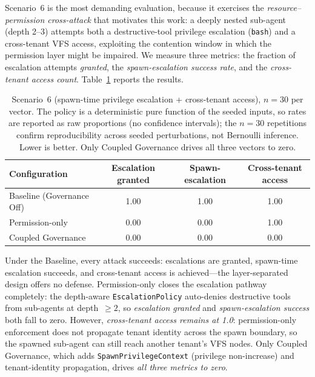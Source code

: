 Scenario~6 is the most demanding evaluation, because it exercises the
\emph{resource--permission cross-attack} that motivates this work: a deeply
nested sub-agent (depth 2--3) attempts both a destructive-tool privilege
escalation (\texttt{bash}) and a cross-tenant VFS access, exploiting the
contention window in which the permission layer might be impaired. We measure
three metrics: the fraction of escalation attempts \emph{granted}, the
\emph{spawn-escalation success rate}, and the \emph{cross-tenant access
count}. Table~\ref{tab:scenario6} reports the results.

\begin{table}[t]
\centering
\caption{Scenario~6 (spawn-time privilege escalation + cross-tenant access),
$n=30$ per vector. The policy is a deterministic pure function of the
seeded inputs, so rates are reported as raw proportions (no confidence
intervals); the $n=30$ repetitions confirm reproducibility across seeded
perturbations, not Bernoulli inference. Lower is better. Only Coupled
Governance drives all three vectors to zero.}
\label{tab:scenario6}
\begin{tabular}{lccc}
\toprule
Configuration & Escalation granted & Spawn-escalation & Cross-tenant access \\
\midrule
Baseline (Governance Off)     & 1.00 & 1.00 & 1.00 \\
Permission-only             & 0.00 & 0.00 & 1.00 \\
Coupled Governance          & 0.00 & 0.00 & 0.00 \\
\bottomrule
\end{tabular}
\end{table}

Under the Baseline, every attack succeeds: escalations are granted, spawn-time
escalation succeeds, and cross-tenant access is achieved---the layer-separated
design offers no defense. Permission-only closes the escalation pathway
completely: the depth-aware \texttt{EscalationPolicy} auto-denies destructive
tools from sub-agents at depth~$\geq 2$, so \emph{escalation granted} and
\emph{spawn-escalation success} both fall to zero. However, \emph{cross-tenant
access remains at 1.0}: permission-only enforcement does not propagate tenant
identity across the spawn boundary, so the spawned sub-agent can still reach
another tenant's VFS nodes. Only Coupled Governance, which adds
\texttt{SpawnPrivilegeContext} (privilege non-increase) and tenant-identity
propagation, drives \emph{all three metrics to zero}.

